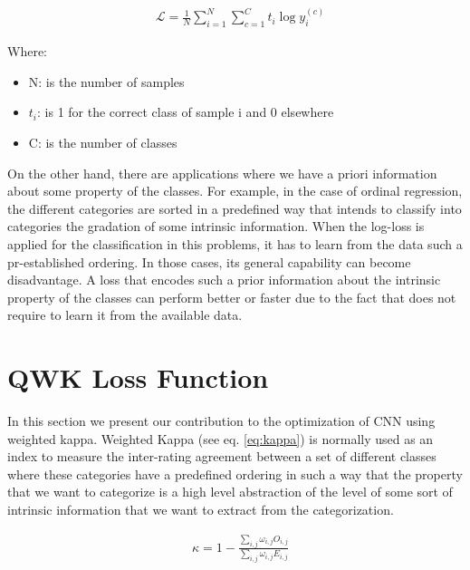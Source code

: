 \documentclass[times,twocolumn,final,authoryear]{elsarticle}
\begin{document}
\begin{equation}
\begin{aligned}
\label{eq:logloss}
&\mathcal{L} = \frac{1}{N} \sum_{i=1}^N \sum_{c=1}^C t_i \log{y_i^{(c)}}
\end{aligned}
\end{equation}

Where:
\begin{itemize}
	\item[] N: is the number of samples
	\item[] $t_i$: is 1 for the correct class of sample i and 0 elsewhere
	\item[] C: is the number of classes
\end{itemize}

On the other hand, there are applications where we have a priori information about some property of the classes. For example, in the case of ordinal regression, the different categories are sorted in a predefined way that intends to classify into categories the gradation of some intrinsic information. When the log-loss is applied for the classification in this problems, it has to learn from the data such a pr-established ordering. In those cases, its general capability can become disadvantage. A loss that encodes such a prior information about the intrinsic property of the classes can perform better or faster due to the fact that does not require to learn it from the available data. 

\section{QWK Loss Function}

In this section we present our contribution to the optimization of CNN using weighted kappa. Weighted Kappa (see eq. \ref{eq:kappa}) is normally used as an index to measure the inter-rating agreement between a set of different classes where these categories have a predefined ordering in such a way that the property that we want to categorize is a high level abstraction of the level of some sort of intrinsic information that we want to extract from the categorization. 

\begin{equation}
\label{eq:kappa}
\begin{aligned}
&\kappa = 1 - \frac{ \sum_{i,j} \omega_{i,j} O_{i,j} }
{\sum_{i,j} \omega_{i,j} E_{i,j}}\\
\end{aligned}
\end{equation}
\end{document}
